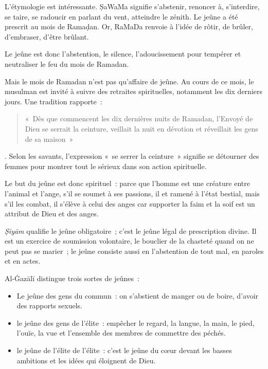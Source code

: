 L'étymologie est intéressante. ṢaWaMa signifie s'abstenir, renoncer à,
s'interdire, se taire, se radoucir en parlant du vent, atteindre le
zénith. Le jeûne a été prescrit au mois de Ramaḍan. Or, RaMaDa renvoie à
l'idée de rôtir, de brûler, d'embraser, d'être brûlant.

\begin{Def}[jeûne]
Le jeûne est donc l'abstention, le silence, l'adoucissement pour
tempérer et neutraliser le feu du mois de Ramadan.
\end{Def}

Mais le mois de Ramadan n'est pas qu'affaire de jeûne. Au cours de ce
mois, le musulman est invité à suivre des retraites spirituelles,
notamment les dix derniers jours. Une tradition rapporte~:
\begin{quote}
    «~Dès que
commencent les dix dernières nuits de Ramadan, l'Envoyé de Dieu se
serrait la ceinture, veillait la nuit en dévotion et réveillait les gens
de sa maison~»
\end{quote}. Selon les savants, l'expression «~se serrer la
ceinture~» signifie se détourner des femmes pour montrer tout le sérieux
dans son action spirituelle.

Le but du jeûne est donc spirituel~: parce que l'homme est une créature
entre l'animal et l'ange, s'il se soumet à ses passions, il et ramené à
l'état bestial, mais s'il les combat, il s'élève à celui des anges car
supporter la faim et la soif est un attribut de Dieu et des anges.


\emph{Ṣiyām} qualifie le jeûne obligatoire~; c'est le jeûne légal de
prescription divine. Il est un exercice de soumission volontaire, le
bouclier de la chasteté quand on ne peut pas se marier~; le jeûne
consiste aussi en l'abstention de tout mal, en paroles et en actes.

Al-Ġazālī \label{theol:AlGazali16} distingue trois sortes de jeûnes~:

\begin{itemize}
\item
  Le jeûne des gens du commun~: on s'abstient de manger ou de boire,
  d'avoir des rapports sexuels.
\item
  le jeûne des gens de l'élite~: empêcher le regard, la langue, la main,
  le pied, l'ouïe, la vue et l'ensemble des membres de commettre des
  péchés.
\item
  le jeûne de l'élite de l'élite~: c'est le jeûne du cœur devant les
  basses ambitions et les idées qui éloignent de Dieu.
\end{itemize}

